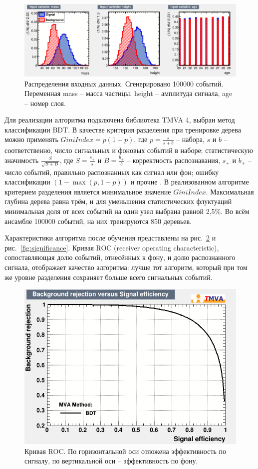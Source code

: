 \documentclass[14pt]{extarticle}
\begin{document}
\begin{figure}[h!]
	\centering
	\includegraphics[width=\linewidth]{../pics/inputdistr.png}
	\caption{Распределения входных данных. Сгенерировано 100000 событий. Переменная mass -- масса частицы, height -- амплитуда сигнала, age -- номер слоя.}
	\label{fig:gendistr}
\end{figure}

Для реализации алгоритма подключена библиотека TMVA 4, выбран метод классификации BDT. В качестве критерия разделения при тренировке дерева можно применять $GiniIndex = p(1-p)$, где $p = \frac{s}{s+b}$ --  набора, $s$ и $b$ -- соответственно, число сигнальных и фоновых событий в наборе; статистическую значимость $\frac{S}{\sqrt{S+B}}$, где $S=\frac{s_+}{s}$ и $B=\frac{b_+}{b}$ -- корректность распознавания, $s_+$ и $b_+$ -- число событий, правильно распознанных как сигнал или фон; ошибку классификации $(1-\max (p,{1-p}))$ и прочие \cite{tmva4}. В реализованном алгоритме критерием разделения является минимальное значение $GiniIndex$. Максимальная глубина дерева равна трём, и для уменьшения статистических флуктуаций минимальная доля от всех событий на один узел выбрана равной 2,5\%. Во всём ансамбле 100000 событий, на них тренируются 850 деревьев.

Характеристики алгоритма после обучения представлены на рис.~\ref{fig:roc} и рис.~\ref{fig:significance}. Кривая ROC (receiver operating characteristic), сопоставляющая долю событий, отнесённых к фону, и долю распознанного сигнала, отображает качество алгоритма: лучше тот алгоритм, который при том же уровне разделения сохраняет больше всего сигнальных событий.

\begin{figure}[h!]
	\centering
	\includegraphics[width=0.7\linewidth]{../pics/ROC.png}
	\caption{Кривая ROC. По горизонтальной оси отложена эффективность по сигналу, по вертикальной оси -- эффективность по фону.}
	\label{fig:roc}
\end{figure}
\end{document}
